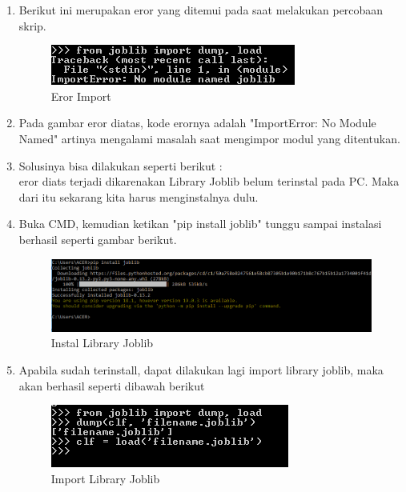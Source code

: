 \begin{enumerate}
	\item
	Berikut ini merupakan eror yang ditemui pada saat melakukan percobaan skrip.
\begin{figure}
	\begin{center}
   	 \includegraphics[scale=1]{figures/andrierror.png}
   	 \caption{Eror Import}
	\end{center}
\end{figure}
	\item
Pada gambar eror diatas, kode erornya adalah "ImportError: No Module Named" artinya mengalami masalah saat mengimpor modul yang ditentukan.
	\item
Solusinya bisa dilakukan seperti berikut :\\
eror diats terjadi dikarenakan Library Joblib belum terinstal pada PC. Maka dari itu sekarang kita harus menginstalnya dulu.
	\item
Buka CMD, kemudian ketikan "pip install joblib" tunggu sampai instalasi berhasil seperti gambar berikut.
\begin{figure}
	\begin{center}
   	 \includegraphics[scale=1]{figures/solusiAndri.png}
   	 \caption{Instal Library Joblib}
	\end{center}
\end{figure}
	\item
Apabila sudah terinstall, dapat dilakukan lagi import library joblib, maka akan berhasil seperti dibawah berikut
\begin{figure}
	\begin{center}
   	 \includegraphics[scale=1]{figures/solusiAndrii.png}
   	 \caption{ Import Library Joblib}
	\end{center}
\end{figure}
\end{enumerate}




